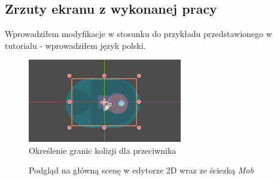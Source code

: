 \documentclass[a4paper]{article}
\begin{document}
\begin{sloppypar}
	\subsection{Zrzuty ekranu z wykonanej pracy}
	Wprowadziłem modyfikacje w stosunku do przykładu przedstawionego w tutorialu - wprowadziłem język polski.
	\begin{center}
		\begin{figure}[htb]
			\centering
			\includegraphics[width=0.6\textwidth]{enemy_collision.png}
			\caption{Określenie granic kolizji dla przeciwnika}
		\end{figure}
		\begin{figure}[htb]
			\centering
			\caption{Podgląd na główną scenę w edytorze 2D wraz ze ściezką \emph{Mob}}
		\end{figure}
		\begin{figure}
			\centering

\end{figure}
\end{center}
\end{sloppypar}
\end{document}
